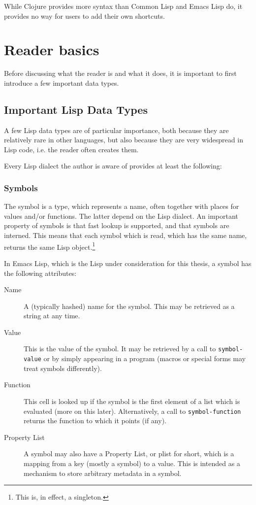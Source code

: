 \documentclass[a4paper]{article}
\newcommand{\el}{Emacs Lisp}
\newcommand{\cl}{Common Lisp}
\newcommand{\fun}[1]{\texttt{#1}}
\begin{document}
While Clojure provides more syntax than \cl{} and \el{} do, it provides no way
for users to add their own shortcuts.

\section{Reader basics}
\label{sec:reader-basics}

Before discussing what the reader is and what it does, it is important to first
introduce a few important data types.
\subsection{Important Lisp Data Types}
\label{subsec:important-types}

A few Lisp data types are of particular importance, both because they are
relatively rare in other languages, but also because they are very widespread in
Lisp code, i.e. the reader often creates them.

Every Lisp dialect the author is aware of provides at least the following:

\subsubsection{Symbols}
\label{subsubsec:symbols}

The symbol is a type, which represents a name, often together with places for
values and/or functions.  The latter depend on the Lisp dialect.  An important
property of symbols is that fast lookup is supported, and that symbols are
interned.  This means that each symbol which is read, which has the same name,
returns the same Lisp object.\footnote{This is, in effect, a singleton.}

In \el{}, which is the Lisp under consideration for this thesis, a symbol has
the following attributes:

\begin{description}
\item[{Name}] A (typically hashed) name for the symbol.  This may be retrieved
  as a string at any time.
\item[{Value}] This is the value of the symbol.  It may be retrieved by a call
  to \fun{symbol-value} or by simply appearing in a program (macros or special
  forms may treat symbols differently).
\item[{Function}] This cell is looked up if the symbol is the first element of a
  list which is evaluated (more on this later).  Alternatively, a call to
  \fun{symbol-function} returns the function to which it points (if any).
\item[{Property List}] A symbol may also have a Property List, or plist for
  short, which is a mapping from a key (mostly a symbol) to a value.  This is
  intended as a mechanism to store arbitrary metadata in a symbol.
\end{description}
\end{document}
